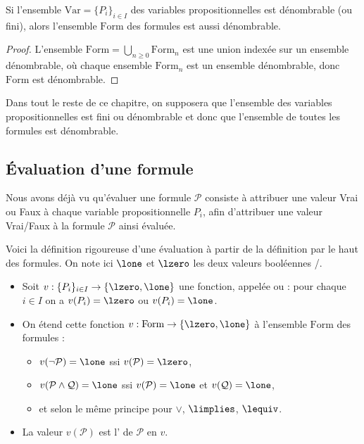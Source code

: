 \documentclass[11pt,class=report,crop=false]{standalone}
\begin{document}
\begin{proposition}
	\label{prop:denomb}
	Si l'ensemble $\text{Var} = \{ P_i \}_{i\in I}$ des variables propositionnelles est dénombrable (ou fini), alors l'ensemble $\text{Form}$ des formules est aussi dénombrable.
\end{proposition}

\begin{proof}
 L'ensemble $\text{Form} = \bigcup_{n\ge0} \text{Form}_n$ est une union indexée sur un ensemble dénombrable, où chaque ensemble $\text{Form}_n$ est un ensemble dénombrable, donc $\text{Form}$ est dénombrable.
\end{proof}

Dans tout le reste de ce chapitre, on supposera que l'ensemble des variables propositionnelles est fini ou dénombrable et donc que l'ensemble de toutes les formules est dénombrable.

\subsection{Évaluation d'une formule}
\label{ssec:evaluation}

Nous avons déjà vu qu'évaluer une formule $\mathcal{P}$ consiste à attribuer une valeur Vrai ou Faux à chaque variable propositionnelle $P_i$, afin d'attribuer une valeur Vrai/Faux à la formule $\mathcal{P}$ ainsi évaluée.

Voici la définition rigoureuse d'une évaluation à partir de la définition \og{}par le haut\fg{} des formules. On note ici $\lone$ et $\lzero$ les deux valeurs booléennes \ltrue/\lfalse.

\begin{definition}
	\sauteligne
	\begin{itemize}
		\item Soit $v : \{ P_i \}_{i\in I} \to \{ \lzero, \lone\}$ une fonction, appelée  ou  : pour chaque $i\in I$ on a $v(P_i) = \lzero$ ou $v(P_i) = \lone$.
		
		\item On étend cette fonction $v : \text{Form} \to \{ \lzero, \lone\}$ à l'ensemble  $\text{Form}$ des formules :
		\begin{itemize}
			\item $v(\lnot \mathcal{P}) = \lone$ ssi $v(\mathcal{P})=  \lzero$,
			
			\item $v(\mathcal{P} \land \mathcal{Q}) = \lone$ ssi $v(\mathcal{P})= \lone$ et $v(\mathcal{Q})=\lone$,
			
			\item et selon le même principe pour $\lor$, $\limplies$, $\lequiv$.
		\end{itemize}
		
		\item La valeur $v(\mathcal{P})$ est l' de $\mathcal{P}$ en $v$.
	\end{itemize}
\end{definition}
\end{document}
